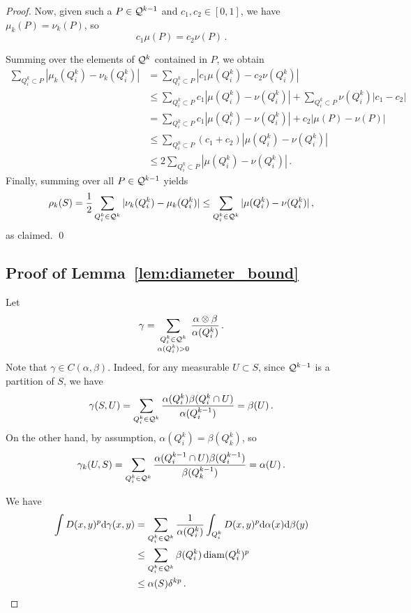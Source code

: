 \begin{proof}
Now, given such a $P \in \mathcal{Q}^{k-1}$ and $c_1, c_2 \in [0, 1]$, we have $\mu_k(P) = \nu_k(P)$, so
\begin{equation*}
c_1 \mu(P) = c_2 \nu(P)\,.
\end{equation*}

Summing over the elements of $\mathcal{Q}^k$ contained in $P$, we obtain
\begin{align*}
\sum_{Q_i^k \subset P} |\mu_k(Q_i^k) - \nu_k(Q_i^k)| & =\sum_{Q_i^k \subset P} |c_1 \mu(Q_i^k) - c_2\nu(Q_i^k)| \\
& \leq \sum_{Q_i^k \subset P} c_1 |\mu(Q_i^k) - \nu(Q_i^k)| + \sum_{Q_i^k \subset P} \nu(Q_i^k) |c_1 - c_2| \\
& = \sum_{Q_i^k \subset P} c_1 |\mu(Q_i^k) - \nu(Q_i^k)| + c_2 |\mu(P) - \nu(P)| \\
& \leq \sum_{Q_i^k \subset P} (c_1 + c_2) |\mu(Q_i^k) - \nu(Q_i^k)| \\
& \leq 2 \sum_{Q_i^k \subset P}|\mu(Q_i^k) - \nu(Q_i^k)|\,.
\end{align*}
Finally, summing over all $P \in \mathcal{Q}^{k-1}$ yields
\begin{equation*}
\rho_k(S) = \frac 1 2 \sum_{Q_i^k \in \mathcal{Q}^k} |\nu_k(Q_i^k) - \mu_k(Q_i^k)| \leq \sum_{Q_i^k \in \mathcal{Q}^k}|\mu(Q_i^k) - \nu(Q_i^k)|\,,
\end{equation*}
as claimed.
\qed

\subsection{Proof of Lemma~\ref{lem:diameter_bound}}
Let
\begin{equation*}
\gamma = \sum_{\substack{Q_i^{k} \in \mathcal{Q}^{k}\\\alpha(Q_i^{k})> 0}} \frac{\alpha \otimes \beta}{\alpha(Q_i^k)}\,.
\end{equation*}
Note that $\gamma \in C(\alpha, \beta)$.
Indeed, for any measurable $U \subset S$, since $\mathcal{Q}^{k-1}$ is a partition of $S$, we have
\begin{equation*}
\gamma(S, U) = \sum_{Q_i^{k} \in \mathcal{Q}^{k}} \frac{\alpha(Q_i^{k}) \beta(Q_i^{k} \cap U)}{\alpha(Q_i^{k-1})} = \beta(U)\,.
\end{equation*}
On the other hand, by assumption, $\alpha(Q_i^{k}) = \beta(Q_k^{k})$, so
\begin{equation*}
\gamma_k(U, S) = \sum_{Q_i^{k} \in \mathcal{Q}^{k}} \frac{\alpha(Q_i^{k-1} \cap U) \beta(Q_i^{k-1})}{\beta(Q_k^{k-1})} = \alpha(U)\,.
\end{equation*}

We have
\begin{align*}
\int D(x, y)^p \mathrm{d}\gamma(x, y) & = \sum_{Q_i^{k} \in \mathcal{Q}^{k}} \frac{1}{\alpha(Q_i^{k})}\int_{Q_i^{k}} D(x, y)^p \mathrm{d}\alpha(x) \mathrm{d}\beta(y) \\
&\leq \sum_{Q_i^{k} \in \mathcal{Q}^{k}} \beta(Q_i^{k}) \operatorname{diam}(Q_i^{k})^p \\
&\leq  \alpha(S) \delta^{kp}\,.
\end{align*}
\end{proof}

